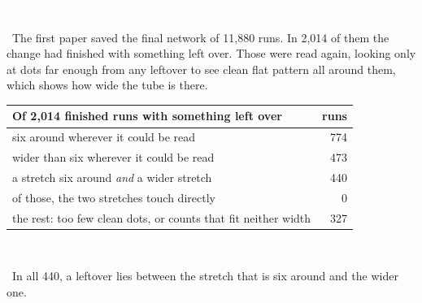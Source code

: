 \documentclass[11pt,letterpaper]{article}
\newcommand{\tagbox}[2]{{\sffamily\scriptsize\colorbox{#1}{\textcolor{white}{\strut #2}}}}
\newcommand{\Exact}{\tagbox{kExact}{EXACT}}
\newcommand{\MeasX}{\tagbox{kMeas}{MEASURED, EXPLORATORY}}
\begin{document}
\MeasX\ The first paper saved the final network of 11,880 runs. In 2,014 of them the change had
finished with something left over. Those were read again, looking only at dots far enough from any
leftover to see clean flat pattern all around them, which shows how wide the tube is there.

\begin{center}
\renewcommand{\arraystretch}{1.15}
\begin{tabular}{@{}lr@{}}
\toprule
Of 2,014 finished runs with something left over & runs\\
\midrule
six around wherever it could be read & 774\\
wider than six wherever it could be read & 473\\
a stretch six around \emph{and} a wider stretch & 440\\
\quad of those, the two stretches touch directly & 0\\
the rest: too few clean dots, or counts that fit neither width & 327\\
\bottomrule
\end{tabular}
\end{center}

\Exact\ In all 440, a leftover lies between the stretch that is six around and the wider one.
\end{document}
